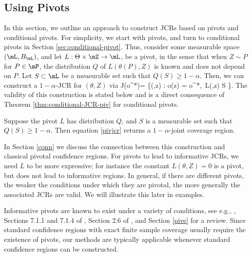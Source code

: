 \documentclass[english]{article}
\begin{document}
\subsection{Using Pivots}
\label{sec:pivot}
In this section, we outline an approach to construct JCRs based on pivots and conditional pivots. 
For simplicity, we start with pivots, and turn to conditional pivots in Section \ref{sec:conditional-pivot}.
Thus, consider some measurable space $(\mL,B_{\mL})$, and 
let $L:\Theta\times\mZ \to \mL$, be a pivot, in the sense that when $Z\sim P$ for $P\in \mP$,
the distribution $Q$ of $L(\theta(P),Z)$ is known and does not depend on $P$. 
Let $S\subset \mL$ be a measurable set such that $Q(S)\ge 1-\alpha$. 
Then, we can 
 construct a  $1-\alpha$-JCR for $(\theta,Z)$ via
\beq\label{pivjcr}
J(o^*)= \left\{(\theta,z) 
\in\Theta\times\mZ: 
o(z) = o^*,\,
L(\theta,z) \in S \right\}.
\eeq
The validity of this construction is stated below and 
is a direct consequence of Theorem \ref{thm:conditional-JCR-piv} for conditional pivots.
\begin{proposition}\label{prop:pivot}
Suppose the pivot $L$ has distribution $Q$, and $S$ is a measurable set such that $Q(S)\ge 1-\alpha$. 
Then
equation \eqref{pivjcr}
returns a $1-\alpha$-joint coverage region.
\end{proposition}
In Section \ref{conn} we discuss the connection between this construction and classical pivotal confidence regions.
For pivots to lead to informative JCRs, we need $L$ to be more expressive; for instance the constant $L(\theta,Z)=0$ is a pivot, but does not lead to informative regions.
In general, if there are different pivots, the weaker the conditions under which they are pivotal, the more generally the associated JCRs are valid. We will illustrate this later in examples.

Informative pivots are known to exist under a variety of conditions, see
e.g.,
\cite{fraser1966structural,fraser1968structure,fraser1971events,brenner1983models,barnard1995pivotal,fraser1996some},
Sections 7.1.1 and 7.1.4 of \cite{shao2003mathematical},
Section 2.6 of \cite{cox2006principles},
and Section \ref{pive} for a review.
Since standard confidence regions with 
exact finite sample coverage usually
require the existence of pivots,
our methods are typically applicable whenever standard confidence regions can be constructed.
\end{document}

